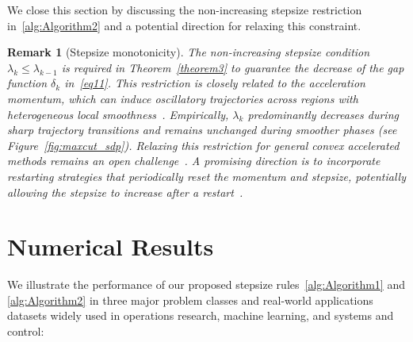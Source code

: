 \documentclass[11pt, a4paper, oneside, reqno]{amsart}
\newtheorem{remark}[theorem]{Remark}
\newcommand{\blank}[1]{\hspace*{#1}\linebreak[0]}
\begin{document}

{\color{black} We close this section by discussing the non-increasing stepsize restriction in~\ref{alg:Algorithm2} and a potential direction for relaxing this constraint.
\begin{remark}[Stepsize monotonicity] \label{remark:nonincreasing stepsize}
The non-increasing stepsize condition $\lambda_k \leq \lambda_{k-1}$ is required in Theorem~\ref{theorem3} to guarantee the decrease of the gap function $\delta_k$ in~\eqref{eq11}. This restriction is closely related to the acceleration momentum, which can induce oscillatory trajectories across regions with heterogeneous local smoothness~\cite{su2016differential}. Empirically, $\lambda_k$ predominantly decreases during sharp trajectory transitions and remains unchanged during smoother phases (see Figure~\ref{fig:maxcut_sdp}). Relaxing this restriction for general convex accelerated methods remains an open challenge~\cite[Section~3]{Malitsky2020}. A promising direction is to incorporate restarting strategies that periodically reset the momentum and stepsize, potentially allowing the stepsize to increase after a restart~\cite{Emmanuel2015}.
\end{remark}}
\section{Numerical Results}\label{Numerical results}
We illustrate the performance of our proposed stepsize rules~\ref{alg:Algorithm1} and \ref{alg:Algorithm2} in three major problem classes and {real-world applications datasets} widely used in operations research, machine learning, and systems and control:  
\end{document}
